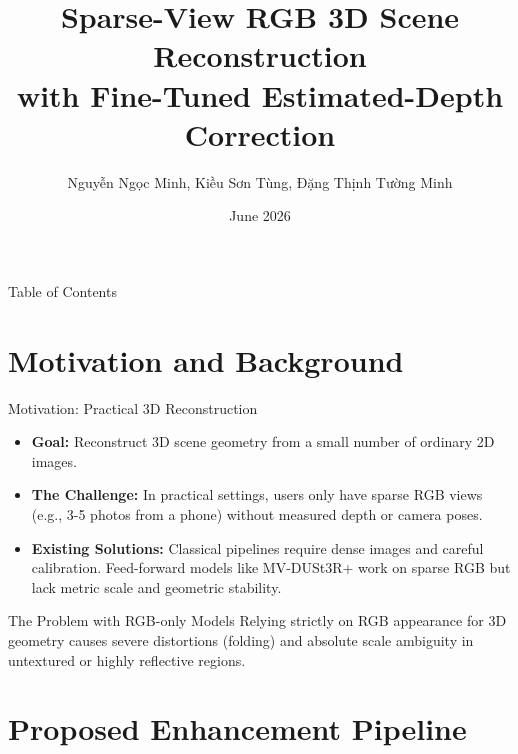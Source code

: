 \documentclass[aspectratio=169]{beamer}
\title[Sparse-View RGB + Estimated Depth]{Sparse-View RGB 3D Scene Reconstruction\\with Fine-Tuned Estimated-Depth Correction}
\author[CV Team]{Nguyễn Ngọc Minh, Kiều Sơn Tùng, Đặng Thịnh Tường Minh}
\institute[IT4343E]{IT4343E - Computer Vision}
\date{June 2026}
\begin{document}
\begin{frame}
    \titlepage
\end{frame}

\begin{frame}{Table of Contents}
    \tableofcontents
\end{frame}

\section{Motivation and Background}

\begin{frame}{Motivation: Practical 3D Reconstruction}
    \begin{itemize}
        \item \textbf{Goal:} Reconstruct 3D scene geometry from a small number of ordinary 2D images.
        \item \textbf{The Challenge:} In practical settings, users only have sparse RGB views (e.g., 3-5 photos from a phone) without measured depth or camera poses.
        \item \textbf{Existing Solutions:} Classical pipelines require dense images and careful calibration. Feed-forward models like MV-DUSt3R+ work on sparse RGB but lack metric scale and geometric stability.
    \end{itemize}
    \vspace{0.5cm}
    \begin{block}{The Problem with RGB-only Models}
        Relying strictly on RGB appearance for 3D geometry causes severe distortions (folding) and absolute scale ambiguity in untextured or highly reflective regions.
    \end{block}
\end{frame}

\section{Proposed Enhancement Pipeline}
\end{document}
